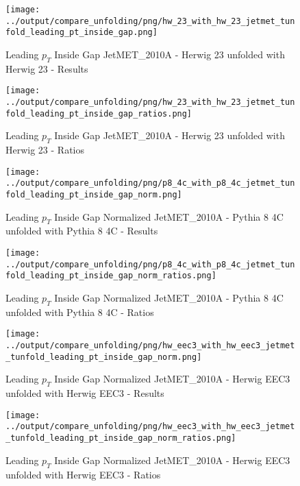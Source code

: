 \documentclass[11pt]{book}
\begin{document}
\begin{figure}[ht]
\centering
\texttt{[image: ../output/compare\_unfolding/png/hw\_23\_with\_hw\_23\_jetmet\_tunfold\_leading\_pt\_inside\_gap.png]}
\caption{Leading $p_{T}$ Inside Gap JetMET\_2010A - Herwig 23 unfolded with Herwig 23 - Results}
\label{hw_23_hw_23_jetmet_tunfold_leading_pt_inside_gap_a}
\end{figure}

\begin{figure}[ht]
\centering
\texttt{[image: ../output/compare\_unfolding/png/hw\_23\_with\_hw\_23\_jetmet\_tunfold\_leading\_pt\_inside\_gap\_ratios.png]}
\caption{Leading $p_{T}$ Inside Gap JetMET\_2010A - Herwig 23 unfolded with Herwig 23 - Ratios}
\label{hw_23_hw_23_jetmet_tunfold_leading_pt_inside_gap_b}
\end{figure}

\begin{figure}[ht]
\centering
\texttt{[image: ../output/compare\_unfolding/png/p8\_4c\_with\_p8\_4c\_jetmet\_tunfold\_leading\_pt\_inside\_gap\_norm.png]}
\caption{Leading $p_{T}$ Inside Gap Normalized JetMET\_2010A - Pythia 8 4C unfolded with Pythia 8 4C - Results}
\label{p8_p8_jetmet_tunfold_leading_pt_inside_gap_norm_a}
\end{figure}

\begin{figure}[ht]
\centering
\texttt{[image: ../output/compare\_unfolding/png/p8\_4c\_with\_p8\_4c\_jetmet\_tunfold\_leading\_pt\_inside\_gap\_norm\_ratios.png]}
\caption{Leading $p_{T}$ Inside Gap Normalized JetMET\_2010A - Pythia 8 4C unfolded with Pythia 8 4C - Ratios}
\label{p8_p8_jetmet_tunfold_leading_pt_inside_gap_norm_b}
\end{figure}

\begin{figure}[ht]
\centering
\texttt{[image: ../output/compare\_unfolding/png/hw\_eec3\_with\_hw\_eec3\_jetmet\_tunfold\_leading\_pt\_inside\_gap\_norm.png]}
\caption{Leading $p_{T}$ Inside Gap Normalized JetMET\_2010A - Herwig EEC3 unfolded with Herwig EEC3 - Results}
\label{hw_eec3_hw_eec3_jetmet_tunfold_leading_pt_inside_gap_norm_a}
\end{figure}

\begin{figure}[ht]
\centering
\texttt{[image: ../output/compare\_unfolding/png/hw\_eec3\_with\_hw\_eec3\_jetmet\_tunfold\_leading\_pt\_inside\_gap\_norm\_ratios.png]}
\caption{Leading $p_{T}$ Inside Gap Normalized JetMET\_2010A - Herwig EEC3 unfolded with Herwig EEC3 - Ratios}
\label{hw_eec3_hw_eec3_jetmet_tunfold_leading_pt_inside_gap_norm_b}
\end{figure}
\end{document}
